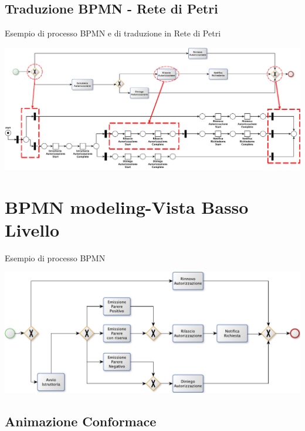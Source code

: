 \documentclass[10pt]{beamer}
\begin{document}
	\subsection{Traduzione BPMN - Rete di Petri}
	\begin{frame}{Esempio di processo BPMN e di traduzione in Rete di Petri}
	  
	  \begin{center}
	    \includegraphics[scale=0.60]{./fig/BPMNandPN}
	  \end{center}
	\end{frame}
	
	\section{BPMN modeling-Vista Basso Livello}
	\begin{frame}{Esempio di processo BPMN}
	   
	  \begin{center}
	    \includegraphics[scale=0.60]{./fig/BPMN}
	  \end{center}
	\end{frame}
	
	\subsection{Animazione Conformace}
	
	
\end{document}
